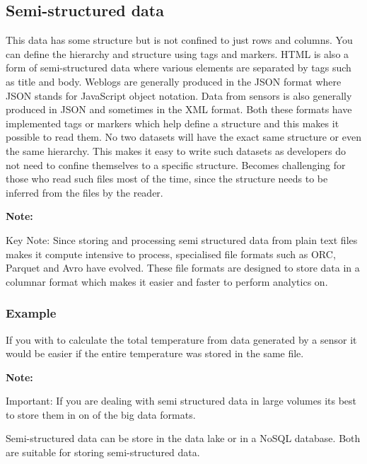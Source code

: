\documentclass[a4paper, 11pt]{article}
\newenvironment{note}{
    \begin{siderule}
        \textbf{Note: }
        }{
    \end{siderule}}
\begin{document}
    \subsection{Semi-structured data}
    This data has some structure but is not confined to just rows and columns.
    You can define the hierarchy and structure using tags and markers.
    HTML is also a form of semi-structured data where various elements are separated by tags such as title and body.
    Weblogs are generally produced in the JSON format where JSON stands for JavaScript object notation.
    Data from sensors is also generally produced in JSON and sometimes in the XML format.
    Both these formats have implemented tags or markers which help define a structure and this makes it possible to read them.
    No two datasets will have the exact same structure or even the same hierarchy.
    This makes it easy to write such datasets as developers do not need to confine themselves to a specific structure.
    Becomes challenging for those who read such files most of the time, since the structure needs to be inferred from the files by the reader.

    \begin{note}
        Key Note: Since storing and processing semi structured data from plain text files makes it compute intensive to process, specialised file formats such as ORC, Parquet and Avro have evolved.
        These file formats are designed to store data in a columnar format which makes it easier and faster to perform analytics on.
    \end{note}
\subsubsection{Example}
         If you with to calculate the total temperature from data generated by a sensor it would be easier if the entire temperature was stored in the same file.

         \begin{note}
         Important: If you are dealing with semi structured data in large volumes its best to store them in on of the big data formats.
         \end{note}

    Semi-structured data can be store in the data lake or in a NoSQL database. Both are suitable for storing semi-structured data.
\end{document}
